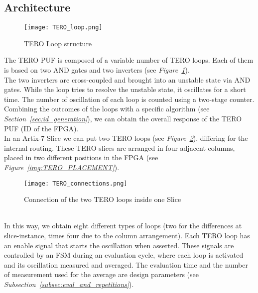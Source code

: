 \subsection{Architecture}
\begin{figure}
    \centering
    \texttt{[image: TERO\_loop.png]}
    \caption{TERO Loop structure}
    \label{img:TERO_LOOP}
\end{figure}
The TERO PUF is composed of a variable number of TERO loops. Each of them is based on
two AND gates and two inverters (see \textit{Figure~\ref{img:TERO_LOOP}}). \\
The two inverters are cross-coupled and brought into an unstable state via AND gates. 
While the loop tries to resolve the unstable state, it oscillates for a short time.
The number of oscillation of each loop is counted using a two-stage counter.
Combining the outcomes of the loops with a specific algorithm (see \textit{Section~\ref{sec:id_generation}}),
we can obtain the overall response of the TERO PUF (ID of the FPGA). \\
In an Artix-7 Slice we can put two TERO loops (see \textit{Figure~\ref{img:TERO_CONNECTIONS}}), differing for the internal routing.
These TERO slices are arranged in four adjacent columns, placed in two different positions in the FPGA (see \textit{Figure~\ref{img:TERO_PLACEMENT}}).
\begin{figure}[h]
    \centering
    \texttt{[image: TERO\_connections.png]}
    \caption{Connection of the two TERO loops inside one Slice}
    \label{img:TERO_CONNECTIONS}
\end{figure} \\
In this way, we obtain eight different types of loops 
(two for the differences at slice-instance, times four due to the column arrangement).
Each TERO loop has an enable signal that starts the oscillation when asserted. 
These signals are controlled by an FSM during an evaluation cycle, where each loop is activated and its oscillation measured and averaged.
The evaluation time and the number of measurement used for the average are design parameters (see \textit{Subsection~\ref{subsec:eval_and_repetitions}}).


